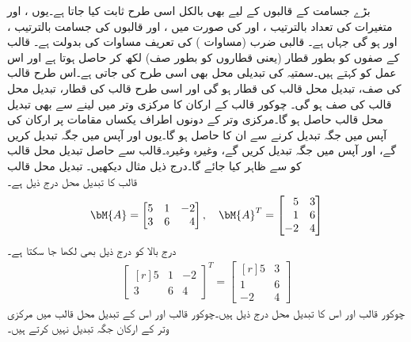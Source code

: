 بڑے جسامت کے قالبوں کے لیے بھی  بالکل اسی طرح ثابت کیا جاتا ہے۔یوں ،  اور  متغیرات کی تعداد بالترتیب ،  اور  کی صورت میں ،  اور  قالبوں کی جسامت بالترتیب ،  اور  ہو گی جہاں  ہے۔  قالبی ضرب (مساوات )  کی تعریف مساوات  کی بدولت ہے۔
قالب کے صفوں کو بطور قطار (یعنی قطاروں کو بطور صف) لکھ کر  حاصل ہوتا ہے اور اس عمل کو  کہتے ہیں۔سمتیہ کی تبدیلی محل بھی اسی طرح کی جاتی ہے۔اس طرح قالب کی  صف، تبدیل محل قالب کی قطار ہو گی  اور    اسی طرح قالب کی  قطار، تبدیل محل قالب کی صف ہو گی۔ چوکور قالب کے ارکان کا مرکزی وتر میں  لینے سے بھی تبدیل محل قالب حاصل ہو گا۔مرکزی وتر کے دونوں اطراف یکساں مقامات پر ارکان کی آپس میں جگہ تبدیل کرنے سے ان کا  حاصل ہو گا۔یوں  اور  آپس میں جگہ تبدیل کریں گے،  اور  آپس میں جگہ تبدیل کریں گے، وغیرہ وغیرہ۔قالب  سے حاصل تبدیل محل قالب کو  سے ظاہر کیا جائے گا۔درج ذیل مثال دیکھیں۔
\quad تبدیل محل قالب\\
قالب  کا تبدیل محل  درج ذیل ہے۔
\begin{align*}
\bM{A}=\begin{bmatrix*}[r] 5&1&-2\\3&6&4  \end{bmatrix*}, \quad \bM{A}^T=\begin{bmatrix*}[r] 5&3\\1&6\\-2&4 \end{bmatrix*}
\end{align*}
درج بالا کو درج ذیل بھی لکھا جا سکتا ہے۔
\begin{align*}
\begin{bmatrix*}[r] 5&1&-2\\3&6&4  \end{bmatrix*}^T=\begin{bmatrix*}[r] 5&3\\1&6\\-2&4 \end{bmatrix*}
\end{align*}
چوکور قالب اور اس کا تبدیل محل درج ذیل ہیں۔چوکور قالب اور اس کے تبدیل محل قالب میں مرکزی وتر کے ارکان جگہ تبدیل نہیں کرتے ہیں۔
